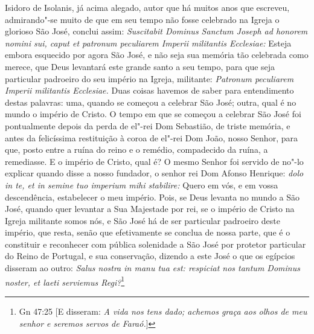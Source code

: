 Isidoro de Isolanis, já acima alegado, autor que há muitos anos que
escreveu, admirando"-se muito de que em seu tempo não fosse celebrado na
Igreja o glorioso São José, conclui assim: \emph{Suscitabit Dominus
Sanctum Joseph ad honorem nomini sui, caput et patronum peculiarem
Imperii militantis Ecclesiae:} Esteja embora esquecido por agora São
José, e não seja sua memória tão celebrada como merece, que Deus
levantará este grande santo a seu tempo, para que seja particular
padroeiro do seu império na Igreja, militante: \emph{Patronum peculiarem
Imperii militantis Ecclesiae.} Duas coisas havemos de saber para
entendimento destas palavras: uma, quando se começou a celebrar São
José; outra, qual é no mundo o império de Cristo. O tempo em que se
começou a celebrar São José foi pontualmente depois da perda de el"-rei
Dom Sebastião, de triste memória, e antes da felicíssima restituição à
coroa de el"-rei Dom João, nosso Senhor, para que, posto entre a ruína do
reino e o remédio, compadecido da ruína, a remediasse. E o império de
Cristo, qual é? O mesmo Senhor foi servido de no"-lo explicar quando
disse a nosso fundador, o senhor rei Dom Afonso Henrique: \emph{dolo in
te, et in semine tuo imperium mihi stabilire:} Quero em vós, e em vossa
descendência, estabelecer o meu império. Pois, se Deus levanta no
mundo a São José, quando quer levantar a Sua Majestade por rei, se o
império de Cristo na Igreja militante somos nós, e São José há de ser
particular padroeiro deste império, que resta, senão que efetivamente se
conclua de nossa parte, que é o constituir e reconhecer com pública
solenidade a São José por protetor particular do Reino de Portugal, e
sua conservação, dizendo a este José o que os egípcios disseram ao
outro: \emph{Salus nostra in manu tua est: respiciat nos tantum Dominus
noster, et laeti serviemus Regi?}\footnote{Gn 47:25 [E disseram: \textit{A vida nos tens dado; achemos graça aos olhos de meu senhor e seremos servos de Faraó.}]}


